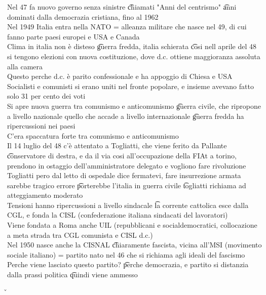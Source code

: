 \documentclass[12pt]{article}
\begin{document}
Nel 47 fa nuovo governo senza sinistre \t chiamati "Anni del centrismo" \t anni dominati dalla democrazia cristiana, fino al 1962 \\
Nel 1949 Italia entra nella NATO = alleanza militare che nasce nel 49, di cui fanno parte paesi europei e USA e Canada \\
Clima in italia non è disteso \t guerra fredda, italia schierata \t cosi nell aprile del 48 si tengono elezioni con nuova costituzione, dove d.c. ottiene maggioranza assoluta alla camera \\
Questo perche d.c. è parito confessionale e ha appoggio di Chiesa e USA \\
Socialisti e comunisti si erano uniti nel fronte popolare, e insieme avevano fatto solo 31 per cento dei voti \\
Si apre nuova guerra tra comunismo e anticomunismo \t guerra civile, che ripropone a livello nazionale quello che accade a livello internazionale \t guerra fredda ha ripercussioni nei paesi \\
C'era spaccatura forte tra comunismo e anticomunismo \\
Il 14 luglio del 48 c'è attentato a Togliatti, che viene ferito da Pallante \t conservatore di destra, e da il via cosi all'occupazione della FIAt a torino, prendono in ostaggio dell'amministratore delegato e vogliono fare rivoluzione \\
Togliatti pero dal letto di ospedale dice fermatevi, fare insurrezione armata sarebbe tragico errore \t porterebbe l'italia in guerra civile \t togliatti richiama ad atteggiamento moderato \\
Tensioni hanno ripercussioni a livello sindacale \t la corrente cattolica esce dalla CGL, e fonda la CISL (confederazione italiana sindacati del lavoratori) \\
Viene fondata a Roma anche UIL (repubblicani e socialdemocratici, collocazione a meta strada tra CGL comunista e CISL d.c.) \\
Nel 1950 nasce anche la CISNAL \t chiaramente fascista, vicina all'MSI (movimento sociale italiano) = partito nato nel 46 che si richiama agli ideali del fascismo \\
Perche viene lasciato questo partito? \t perche democrazia, e partito si distanzia dalla prassi politica \t quindi viene ammesso

\v
\end{document}
